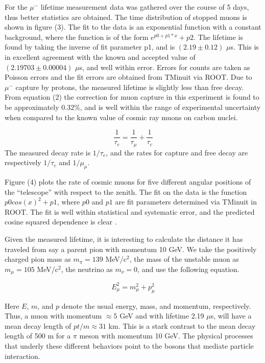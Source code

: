 \documentclass[11pt,twocolumn]{article}
\begin{document}
For the $\mu^{-}$ lifetime measurement data was gathered over the course of 5 days, thus better statistics are obtained. The time distribution of stopped muons is shown in figure (3). The fit to the data is an exponential function with a constant background, where the function is of the form $e^{p0 + p1*x}+p2$. The lifetime is found by taking the inverse of fit parameter p1, and is $(2.19 \pm 0.12)$ $\mu$s. This is in excellent agreement with the known and accepted value of $(2.19703 \pm 0.00004)$ $\mu$s, and well within error. \cite{mass} Errors for counts are taken as Poisson errors and the fit errors are obtained from TMinuit via ROOT. Due to $\mu^{-}$ capture by protons, the measured lifetime is slightly less than free decay. From equation (2) the correction for muon capture in this experiment is found to be approximately $0.32\%$, and is well within the range of experimental uncertainty when compared to the known value of cosmic ray muons on carbon nuclei.\cite{mass}

\begin{equation}
\frac{1}{\tau_e} = \frac{1}{\tau_{\mu}} + \frac{1}{\tau_c}
\end{equation}
The measured decay rate is $1/\tau_e$, and the rates for capture and free decay are respectively $1/\tau_{c}$ and $1/\mu_{\mu}$.


Figure (4) plots the rate of cosmic muons for five different angular positions of the ``telescope'' with respect to the zenith. The fit on the data is the function $p0 cos(x)^2 + p1$, where $p0$ and $p1$ are fit parameters determined via TMinuit in ROOT. The fit is well within statistical and systematic error, and the predicted cosine squared dependence is clear \cite{pdg}.  
  
Given the measured lifetime, it is interesting to calculate the distance it has traveled from say a parent pion with momentum 10 GeV. We take the positively charged pion mass as $m_{\pi} = 139$ MeV/c$^{2}$, the mass of the unstable muon as $m_{\mu} = 105$ MeV/c$^2$, the neutrino as $m_{\nu} = 0$, and use the following equation. 

\begin{equation}
E_{\mu}^2 = m_{\mu}^2 + p_{\mu}^2
\end{equation}

Here $E$, $m$, and $p$ denote the usual energy, mass, and momentum, respectively. Thus, a muon with momentum $\approx 5$ GeV and with lifetime 2.19 $\mu$s, will have a mean decay length of $pt/m \approx 31$ km. This is a stark contrast to the mean decay length of 500 m for a $\pi$ meson with momentum 10 GeV. The physical processes that underly these different behaviors point to the bosons that mediate particle interaction.  
\end{document}
